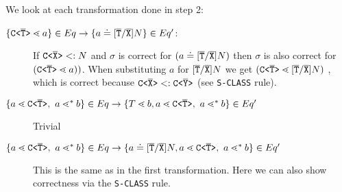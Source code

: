 \begin{description}
We look at each transformation done in step 2:
\begin{description}
\item[$\{ \mathtt{C \texttt{<} \overline{\tt T} \texttt{>} } \lessdot a \} \in Eq \to \{ a \doteq [\overline{\tt T}/\overline{\tt X}]N \} \in Eq'$:]
If $\mathtt{C \texttt{<} \overline{\tt X} \texttt{>} } <: N$ and $\sigma$ is correct for $(a \doteq [\overline{\tt T}/\overline{\tt X}]N)$
then $\sigma$ is also correct for $(\mathtt{C \texttt{<} \overline{\tt T} \texttt{>} } \lessdot a))$.
When substituting $a$ for $[\overline{\tt T}/\overline{\tt X}]N$ we get 
$(\mathtt{C \texttt{<} \overline{\tt T} \texttt{>} } \lessdot [\overline{\tt T}/\overline{\tt X}]N)$
, which is correct because $\mathtt{C \texttt{<} \overline{\tt X} \texttt{>} } <: \mathtt{C \texttt{<} \overline{\tt Y} \texttt{>} }$
(see \texttt{S-CLASS} rule).
\item[$\{ a \lessdot \mathtt{C \texttt{<} \overline{T} \texttt{>} },\ a \lessdot^* b \} \in Eq \to \{ T \lessdot b, a \lessdot \mathtt{C \texttt{<} \overline{T} \texttt{>} },\ a \lessdot^* b \} \in Eq'$]
Trivial
\item[$\{ a \lessdot \mathtt{C \texttt{<} \overline{T} \texttt{>} },\ a \lessdot^* b \} \in Eq \to \{ a \doteq [\overline{\tt T}/\overline{\tt X}]N, a \lessdot \mathtt{C \texttt{<} \overline{T} \texttt{>} },\ a \lessdot^* b \} \in Eq'$]
This is the same as in the first transformation.
Here we can also show correctness via the \texttt{S-CLASS} rule.

\end{description}


\end{description}
